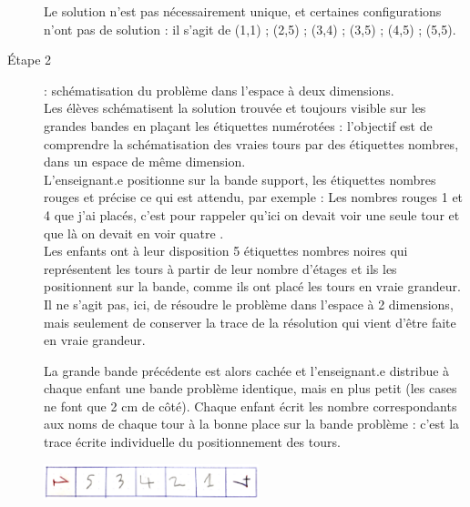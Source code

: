 \begin{exercice*}
\begin{description}
   Le solution n'est pas nécessairement unique, et certaines configurations n'ont pas de solution : il s'agit de (1,1) ; (2,5) ; (3,4) ; (3,5) ; (4,5) ; (5,5).
   \item[Étape 2] : schématisation du problème dans l’espace à deux dimensions. \\
   Les élèves schématisent la solution trouvée et toujours visible sur les grandes bandes en plaçant les étiquettes numérotées : l'objectif est de comprendre la schématisation des vraies tours par des étiquettes nombres, dans un espace de même dimension. \\
   L'enseignant.e positionne sur la bande support, les étiquettes nombres rouges et précise ce qui est attendu, par exemple : \og Les nombres rouges 1 et  4 que j’ai placés, c’est pour rappeler qu’ici on devait voir une seule tour et que là on devait en voir quatre \fg. \\
   Les enfants ont à leur disposition 5 étiquettes nombres noires qui représentent les tours à partir de leur nombre d'étages et ils les positionnent sur la bande, comme ils ont placé les tours en vraie grandeur. Il ne s’agit pas, ici, de résoudre le problème dans l'espace à 2 dimensions, mais seulement de conserver la trace de la résolution qui vient d'être faite en vraie grandeur.
   \begin{center}
   \end{center}
   La grande bande précédente est alors cachée et l'enseignant.e distribue à chaque enfant une bande problème identique, mais en plus petit (les cases ne font que 2 cm de côté). Chaque enfant écrit les nombre correspondants aux noms de chaque tour à la bonne place sur la bande problème : c'est la trace écrite individuelle du positionnement des tours.
   \begin{center}
      \includegraphics[height=1.05cm]{Geometrie_did/Images/Geo6_activites_tours6}
   \end{center}
\end{description}


\end{exercice*}
